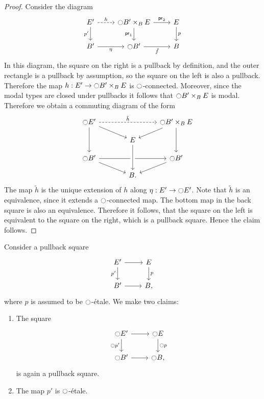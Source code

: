 \documentclass[9pt,twosided]{amsart}
\begin{document}
\begin{proof}
Consider the diagram
\begin{equation*}
\begin{tikzcd}
E' \arrow[r,dashed,"h"] \arrow[d,swap,"{p'}"] & \modal B'\times_{B} E \arrow[r,"\proj 2"] \arrow[d,swap,"\proj 1"] & E \arrow[d,"p"] \\
B' \arrow[r,swap,"\modalunit"] & \modal B' \arrow[r,swap,"\tilde{f}"] & B
\end{tikzcd}
\end{equation*}
In this diagram, the square on the right is a pullback by definition, and the outer rectangle is a pullback by assumption, so the square on the left is also a pullback. Therefore the map $h:E'\to {\ensuremath{\ocircle}} B'\times_B E$ is ${\ocircle}$-connected. Moreover, since the modal types are closed under pullbacks it follows that ${\ocircle} B'\times_B E$ is modal. Therefore we obtain a commuting diagram of the form
\begin{equation*}
  \begin{tikzcd}[row sep=small]
    \modal E' \arrow[dd] \arrow[rr,dashed,"\tilde{h}"] \arrow[dr] & & \modal B'\times_B E \arrow[dd] \arrow[dl] \\
    \phantom{\modal B'\times_B E} & E \\
    \modal B' \arrow[rr] \arrow[dr] & & \modal B' \arrow[dl] \\
    & B. \arrow[from=uu,crossing over]
  \end{tikzcd}
\end{equation*}
The map $\tilde{h}$ is the unique extension of $h$ along $\eta:E'\to {\ensuremath{\ocircle}} E'$. Note that $\tilde{h}$ is an equivalence, since it extends a ${\ocircle}$-connected map. The bottom map in the back square is also an equivalence. Therefore it follows, that the square on the left is equivalent to the square on the right, which is a pullback square. Hence the claim follows.
\end{proof}

\begin{cor}\label{cor:etale_lex}
Consider a pullback square
\begin{equation*}
\begin{tikzcd}
E' \arrow[d,swap,"{p'}"] \arrow[r] & E \arrow[d,"p"] \\
B' \arrow[r] & B,
\end{tikzcd}
\end{equation*}
where $p$ is assumed to be ${\ocircle}$-\'etale. We make two claims:
\begin{enumerate}
\item The square
\begin{equation*}
\begin{tikzcd}
\modal E' \arrow[d,swap,"{\modal p'}"] \arrow[r] & \modal E \arrow[d,"\modal p"] \\
\modal B' \arrow[r] & \modal B,
\end{tikzcd}
\end{equation*}
is again a pullback square.
\item The map $p'$ is ${\ocircle}$-\'etale.
\end{enumerate}
\end{cor}
\end{document}
